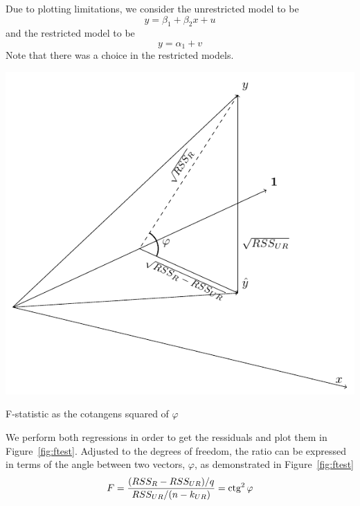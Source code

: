 Due to plotting limitations, we consider the unrestricted model to be
\[
y = \beta_1 + \beta_2 x + u
\]
and the restricted model to be
\[
y = \alpha_1 + v
\]
Note that there was a choice in the restricted models.

\begin{marginfigure}
\includegraphics[scale=0.55]{figures/04_ftest.pdf}
\caption{F-statistic as the cotangens squared of $\varphi$}
\label{fig:ftest}
\end{marginfigure}

We perform both regressions in order to get the ressiduals and plot them
in Figure~\ref{fig:ftest}.
Adjusted to the degrees of freedom, the ratio can be expressed in terms of the
angle between two vectors, $\varphi$, as demonstrated in Figure~\ref{fig:ftest}
\[
F = \frac{(RSS_{R} - RSS_{UR})/q}{RSS_{UR}/(n-k_{UR})} = \operatorname{ctg}^2 \varphi
\]
